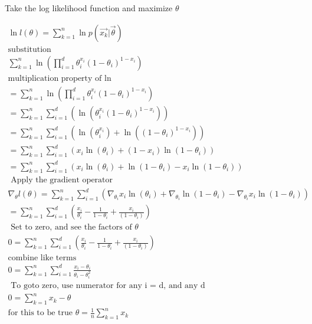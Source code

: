 \documentclass[11pt]{article}
\begin{document}
Take the log likelihood function and maximize $\theta$


\begin{eqnarray}
	\ln l(\theta) = \sum_{k=1}^n \ln p(\vec{x_k} | \vec{\theta}) \\
	\textrm{substitution} \\
	\sum_{k=1}^n  \ln   (\prod_{i=1} ^d \theta_i ^{x_i} (1 - \theta_i)^{1- x_i}) \\
	\textrm {multiplication property of ln} \\
	= \sum_{k=1}^n  \ln  (\prod_{i=1} ^d \theta_i ^{x_i} (1 - \theta_i)^{1- x_i}) \\
	= \sum_{k=1}^n  \sum_{i=1}^d (\ln (\theta_i ^ {x_i} (1-\theta_i) ^{1- x_i } ) )\\
	= \sum_{k=1}^n  \sum_{i=1}^d (\ln (\theta_i ^ {x_i}) + \ln ((1-\theta_i) ^{1- x_i }) ) \\
	= \sum_{k=1}^n  \sum_{i=1}^d (x_i \ln (\theta_i)  + (1 -x_i) \ln(1-\theta_i))\\
	= \sum_{k=1}^n  \sum_{i=1}^d (x_i \ln (\theta_i)  + \ln(1-\theta_i) -x_i \ln(1-\theta_i)) \\
	\textrm{ Apply the gradient operator} \\
	\nabla_{\theta} l(\theta)
	= \sum_{k=1}^n  \sum_{i=1}^d (\nabla_{\theta_i} x_i \ln (\theta_i)  + \nabla_{\theta_i} \ln(1-\theta_i) -\nabla_{\theta_i} x_i \ln(1-\theta_i)) \\
	= \sum_{k=1}^n  \sum_{i=1}^d (\frac{x_i} {\theta_i}  -  \frac{1}{1-\theta_i} + \frac {x_i} {(1-\theta_i)}) \\
	\textrm{ Set to zero, and see the factors of $\theta$} \\
	0 = \sum_{k=1}^n  \sum_{i=1}^d (\frac{x_i} {\theta_i}  -  \frac{1}{1-\theta_i} + \frac {x_i} {(1-\theta_i)}) \\
	\textrm{combine like terms} \\
	0 = \sum_{k=1}^n  \sum_{i=1}^d \frac{ x_i -\theta_i} {\theta_i - \theta_i ^2} \\
	\textrm{ To goto zero, use numerator for any i = d, and any d} \\
	0 = \sum_{k=1}^n  { x_k -\theta}  \\
	\textrm{for this to be true }
	\theta = \frac{1}{n} \sum_{k=1}^n x_k 
\end{eqnarray}
\end{document}
